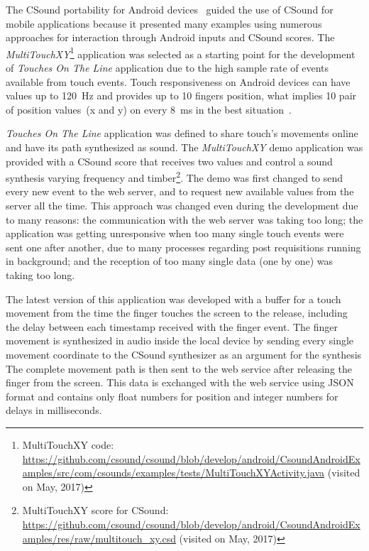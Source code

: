 The CSound portability for Android devices~\citep{Yi2012csound} guided the use of CSound for mobile applications because it presented many examples using numerous approaches for interaction through Android inputs and CSound scores.
The \textit{MultiTouchXY}\footnote{MultiTouchXY code: \url{https://github.com/csound/csound/blob/develop/android/CsoundAndroidExamples/src/com/csounds/examples/tests/MultiTouchXYActivity.java} (visited on May, 2017)} application was selected as a starting point for the development of \textit{Touches On The Line} application due to the high sample rate of events available from touch events.
Touch responsiveness on Android devices can have values up to 120~Hz and provides up to 10 fingers position, what implies 10 pair of position values~(x and y) on every 8~ms in the best situation~\citep{Padre2017touchresponsiveness}.

\textit{Touches On The Line} application was defined to share touch's movements online and have its path synthesized as sound.
The \textit{MultiTouchXY} demo application was provided with a CSound score that receives two values and control a sound synthesis varying frequency and timber\footnote{MultiTouchXY score for CSound: \url{https://github.com/csound/csound/blob/develop/android/CsoundAndroidExamples/res/raw/multitouch_xy.csd} (visited on May, 2017)}.
The demo was first changed to send every new event to the web server, and to request new available values from the server all the time.
This approach was changed even during the development due to many reasons: the communication with the web server was taking too long; 
the application was getting unresponsive when too many single touch events were sent one after another, due to many processes regarding post requisitions running in background;
and the reception of too many single data (one by one) was taking too long.

The latest version of this application was developed with a buffer for a touch movement from the time the finger touches the screen to the release, including the delay between each timestamp received with the finger event.
The finger movement is synthesized in audio inside the local device by sending every single movement coordinate to the CSound synthesizer as an argument for the synthesis
The complete movement path is then sent to the web service after releasing the finger from the screen.
This data is exchanged with the web service using JSON format and contains only float numbers for position and integer numbers for delays in milliseconds.

